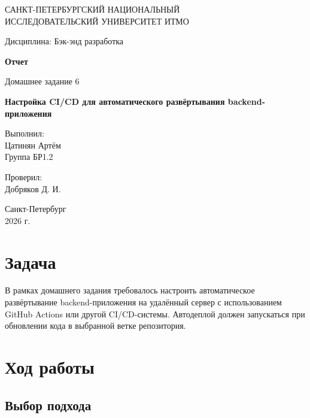 \documentclass[14pt,a4paper]{extarticle}
\begin{document}
\begin{titlepage}
    \begin{center}
        САНКТ-ПЕТЕРБУРГСКИЙ НАЦИОНАЛЬНЫЙ\\
        ИССЛЕДОВАТЕЛЬСКИЙ УНИВЕРСИТЕТ ИТМО

        \vspace{1.5cm}
        Дисциплина: Бэк-энд разработка

        \vspace{1.5cm}
        \textbf{Отчет}

        \vspace{0.5cm}
        Домашнее задание 6

        \vspace{0.5cm}
        \textbf{Настройка CI/CD для автоматического развёртывания backend-приложения}

        \vfill

        \begin{flushright}
            Выполнил:\\
            Цатинян Артём\\
            Группа БР1.2

            \vspace{0.8cm}
            Проверил:\\
            Добряков Д. И.
        \end{flushright}

        \vfill
        Санкт-Петербург\\
        2026 г.
    \end{center}
\end{titlepage}

\section{Задача}

В рамках домашнего задания требовалось настроить автоматическое развёртывание backend-приложения на удалённый сервер с использованием GitHub Actions или другой CI/CD-системы. Автодеплой должен запускаться при обновлении кода в выбранной ветке репозитория.

\section{Ход работы}

\subsection{Выбор подхода}
\end{document}
